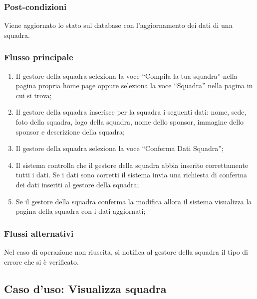 \subsubsection*{Post-condizioni}
Viene aggiornato lo stato sul database con l'aggiornamento dei dati di una squadra.

\subsubsection*{Flusso principale}

\begin{enumerate}
	
	\item
	Il gestore della squadra seleziona la voce ``Compila la tua squadra'' nella pagina propria home page oppure seleziona la voce ``Squadra'' nella pagina in cui si trova;
	
	\item
	Il gestore della squadra inserisce per la squadra i seguenti dati: nome, sede, foto della squadra, logo della squadra, nome dello sponsor, immagine dello sponsor e descrizione della squadra;
	
	\item
	Il gestore della squadra seleziona la voce ``Conferma Dati Squadra'';
	
	\item
	Il sistema controlla che il gestore della squadra abbia inserito correttamente tutti i dati. Se i dati sono corretti il sistema invia una richiesta di conferma dei dati inseriti al gestore della squadra;
	
	\item
	Se il gestore della squadra conferma la modifica allora il sistema visualizza la pagina della squadra con i dati aggiornati;
	
\end{enumerate}

\subsubsection*{Flussi alternativi}
Nel caso di operazione non riuscita, si notifica al gestore della squadra il tipo di errore che si è verificato.


%
%
\subsection{Caso d'uso: Visualizza squadra}
\label{uc-visualizza-squadra}

